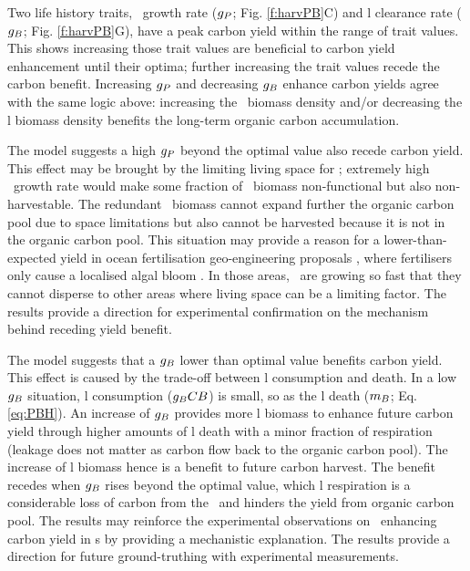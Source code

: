 \documentclass[../thesis.tex]{subfiles} %
\begin{document}
Two life history traits, \phy\ growth rate ($g_P$; Fig. \ref{f:harvPB}C) and \bac l clearance rate ($g_B$; Fig. \ref{f:harvPB}G), have a peak carbon yield within the range of trait values.  This shows increasing those trait values are beneficial to carbon yield enhancement until their optima; further increasing the trait values recede the carbon benefit.  Increasing $g_P$ and decreasing $g_B$ enhance carbon yields agree with the same logic above: increasing the \phy\ biomass density and/or decreasing the \bac l biomass density benefits the long-term organic carbon accumulation.

The model suggests a high $g_P$ beyond the optimal value also recede carbon yield.  This effect may be brought by the limiting living space for \phy; extremely high \phy\ growth rate would make some fraction of \phy\ biomass non-functional but also non-harvestable.  The redundant \phy\ biomass cannot expand further the organic carbon pool due to space limitations but also cannot be harvested because it is not in the organic carbon pool.  This situation may provide a reason for a lower-than-expected yield in ocean fertilisation geo-engineering proposals \autocite{boyd2008implications,gnanadesikan2008export,oschlies2010side}, where fertilisers only cause a localised algal bloom \autocite{gnanadesikan2008export,lawrence2014efficiency,trick2010iron,kwiatkowski2015atmospheric,lovelock2007ocean}.  In those areas, \phy\ are growing so fast that they cannot disperse to other areas where living space can be a limiting factor.  The results provide a direction for experimental confirmation on the mechanism behind receding yield benefit.

The model suggests that a $g_B$ lower than optimal value benefits carbon yield.  This effect is caused by the trade-off between \bac l consumption and death.  In a low $g_B$ situation, \bac l consumption ($g_B CB$) is small, so as the \bac l death ($m_B$; Eq. \ref{eq:PBH}).  An increase of $g_B$ provides more \bac l biomass to enhance future carbon yield through higher amounts of \bac l death with a minor fraction of respiration (leakage does not matter as carbon flow back to the organic carbon pool).  The increase of \bac l biomass hence is a benefit to future carbon harvest.  The benefit recedes when $g_B$ rises beyond the optimal value, which \bac l respiration is a considerable loss of carbon from the \pbs\ and hinders the yield from organic carbon pool.  The results may reinforce the experimental observations on \bac\ enhancing carbon yield in \pbs s \autocite{fuentes2016impact,santos2014microalgal} by providing a mechanistic explanation.  The results provide a direction for future ground-truthing with experimental measurements.
\end{document}
